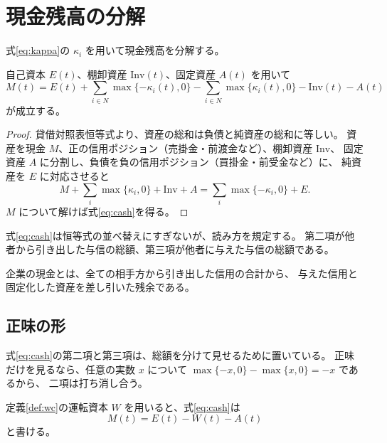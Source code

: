 \section{現金残高の分解}

式\eqref{eq:kappa}の $\kappa_i$ を用いて現金残高を分解する。

\begin{proposition}[現金の信用分解]
\label{prop:cash}
自己資本 $E(t)$、棚卸資産 $\mathrm{Inv}(t)$、固定資産 $A(t)$ を用いて
\begin{equation}
M(t) = E(t) + \sum_{i\in N}\max\{-\kappa_i(t),0\} - \sum_{i\in N}\max\{\kappa_i(t),0\}
- \mathrm{Inv}(t) - A(t)
\label{eq:cash}
\end{equation}
が成立する。
\end{proposition}

\begin{proof}
貸借対照表恒等式より、資産の総和は負債と純資産の総和に等しい。
資産を現金 $M$、正の信用ポジション（売掛金・前渡金など）、棚卸資産 $\mathrm{Inv}$、
固定資産 $A$ に分割し、負債を負の信用ポジション（買掛金・前受金など）に、
純資産を $E$ に対応させると
\[
M + \sum_i \max\{\kappa_i,0\} + \mathrm{Inv} + A
= \sum_i \max\{-\kappa_i,0\} + E .
\]
$M$ について解けば式\eqref{eq:cash}を得る。
\end{proof}

式\eqref{eq:cash}は恒等式の並べ替えにすぎないが、読み方を規定する。
第二項が他者から引き出した与信の総額、第三項が他者に与えた与信の総額である。

\begin{corollary}[現金の意味]
企業の現金とは、全ての相手方から引き出した信用の合計から、
与えた信用と固定化した資産を差し引いた残余である。
\end{corollary}

\subsection{正味の形}
\label{sec:cash-net}

式\eqref{eq:cash}の第二項と第三項は、総額を分けて見せるために置いている。
正味だけを見るなら、任意の実数 $x$ について $\max\{-x,0\}-\max\{x,0\}=-x$ であるから、
二項は打ち消し合う。

\begin{proposition}[現金は運転資本の裏返しである]
\label{prop:cash-net}
定義\ref{def:wc}の運転資本 $W$ を用いると、式\eqref{eq:cash}は
\begin{equation}
M(t) = E(t) - W(t) - A(t)
\label{eq:cash-net}
\end{equation}
と書ける。
\end{proposition}

